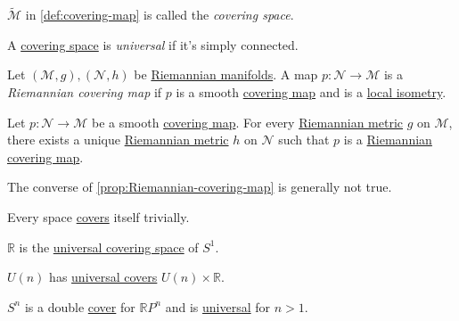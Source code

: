 \begin{notation}\label{not:covering-space}
	\(\widetilde{\mathcal{M}} \) in \autoref{def:covering-map} is called the \emph{covering space}.
\end{notation}

\begin{notation}\label{not:universal-covering-space}
	A \hyperref[not:covering-space]{covering space} is \emph{universal}	if it's simply connected.
\end{notation}

\begin{definition}\label{def:Riemannian-covering-map}
	Let \((\mathcal{M} , g), (\mathcal{N}, h )\) be \hyperref[def:Riemannian-manifold]{Riemannian manifolds}. A map \(p\colon \mathcal{N} \to \mathcal{M} \) is a \emph{Riemannian covering map} if \(p\) is a smooth \hyperref[def:covering-map]{covering map} and is a \hyperref[def:local-isometry]{local isometry}.
\end{definition}

\begin{proposition}\label{prop:Riemannian-covering-map}
	Let \(p\colon \mathcal{N} \to \mathcal{M} \) be a smooth \hyperref[def:covering-map]{covering map}. For every \hyperref[def:Riemannian-metric]{Riemannian metric} \(g\) on \(\mathcal{M} \), there exists a unique \hyperref[def:Riemannian-metric]{Riemannian metric} \(h\) on \(\mathcal{N} \) such that \(p\) is a \hyperref[def:Riemannian-covering-map]{Riemannian covering map}.
\end{proposition}

\begin{note}
	The converse of \autoref{prop:Riemannian-covering-map} is generally not true.
\end{note}

\begin{eg}
	Every space \hyperref[def:covering-map]{covers} itself trivially.
\end{eg}

\begin{eg}
	\(\mathbb{R} \) is the \hyperref[not:universal-covering-space]{universal covering space} of \(S^1\).
\end{eg}

\begin{eg}
	\(U(n)\) has \hyperref[not:universal-covering-space]{universal covers} \(U(n) \times \mathbb{R} \).
\end{eg}

\begin{eg}
	\(S^n\) is a double \hyperref[not:covering-space]{cover} for \(\mathbb{R} P^n\) and is \hyperref[not:universal-covering-space]{universal} for \(n > 1\).
\end{eg}